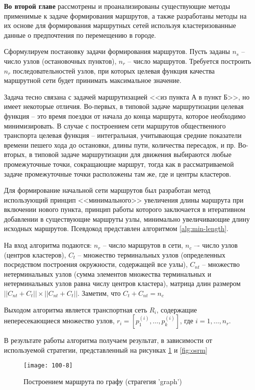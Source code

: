 \textbf{Во второй главе} рассмотрены и проанализированы существующие методы применимые к задаче формирования 
маршрутов, а также разработаны методы на их основе для формирования маршрутных сетей используя 
кластеризованные данные о предпочтения по перемещению в городе.

Сформулируем постановку задачи формирования маршрутов. Пусть заданы \( n_s \) -- число узлов (остановочных 
пунктов), \( n_r \) – число маршрутов. Требуется построить \( n_r \) последовательностей узлов, при которых 
целевая функция качества маршрутной сети будет принимать максимальное значение. 

Задача тесно связана с задачей маршрутизацией <<из пункта А в пункт Б>>, но имеет некоторые отличия. 
Во-первых, в типовой задаче маршрутизации целевая функция – это время поездки от начала до конца маршрута, 
которое необходимо минимизировать. В случае с построением сети маршрутов общественного транспорта целевая 
функция -- интегральная, учитывающая средние показатели времени пешего хода до остановки, длины пути, 
количества пересадок, и пр. Во-вторых, в типовой задаче маршрутизации для движения выбираются любые 
промежуточные точки, сокращающие маршрут, тогда как в рассматриваемой задаче промежуточные точки 
расположены там же, где и центры кластеров.

Для формирование начальной сети маршрутов был разработан метод использующий принцип <<минимального>> 
увеличения длины маршрута при включении нового пункта, принцип работы которого заключается в итеративном 
добавлении в существующие маршруты узлы, минимально увеличивающие длину исходных маршрутов. Псевдокод 
представлен алгоритмом \ref{alg:min-length}.

На вход алгоритма подаются: \( n_r \) -- число маршрутов в сети, \( n_c \) –- число узлов (центров 
кластеров), \( C_t \) – множество терминальных узлов (определенных посредством построения окружности, 
содержащей все узлы), \( C_{nt} \) -- множество нетерминальных узлов (сумма элементов множества терминальных 
и нетерминальных узлов равна числу центров кластера), матрица длин размером 
\( ||{C_{nt}} + {C_{t}}|| \times ||{C_{nt}} + {C_{t}}|| \). Заметим, что \( C_t + C_{nt} = n_c \)

Выходом алгоритма является транспортная сеть \( R_i \), содержащие непересекающиеся множество узлов, 
\( r_{i} = [p_{1}^{(i)}, \dots, p_{k}^{(i)}] \), где \( i = 1, \dots, n_r \). 

В результате работы алгоритма получаем результат, в зависимости от используемой стратегии, представленный на 
рисунках \ref{fig:graph} и \ref{fig:osrm}
\begin{figure}[ht!]
    \centering
    \texttt{[image: 100-8]}
    \caption{Построением маршрута по графу (страгегия 'graph')}
    \label{fig:graph}
\end{figure}

